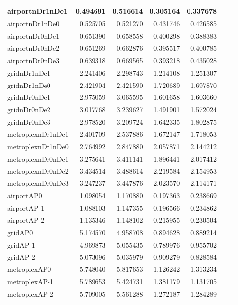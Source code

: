 \begin{longtable}{|l|r|r|r|r|r|r|}
\endlastfoot
airportnDr1nDe1 & 0.494691 & 0.516614 & 0.305164 & 0.337678 \\ \hline
airportnDr1nDe0 & 0.525705 & 0.521270 & 0.431746 & 0.426585 \\ \hline
airportnDr0nDe1 & 0.651390 & 0.658558 & 0.400298 & 0.388383 \\ \hline
airportnDr0nDe2 & 0.651269 & 0.662876 & 0.395517 & 0.400785 \\ \hline
airportnDr0nDe3 & 0.639318 & 0.669565 & 0.393218 & 0.435028 \\ \hline
gridnDr1nDe1 & 2.241406 & 2.298743 & 1.214108 & 1.251307 \\ \hline
gridnDr1nDe0 & 2.421904 & 2.421590 & 1.720689 & 1.697870 \\ \hline
gridnDr0nDe1 & 2.975059 & 3.065595 & 1.601658 & 1.603660 \\ \hline
gridnDr0nDe2 & 3.017768 & 3.239627 & 1.491901 & 1.572024 \\ \hline
gridnDr0nDe3 & 2.978520 & 3.209724 & 1.642335 & 1.802875 \\ \hline
metroplexnDr1nDe1 & 2.401709 & 2.537886 & 1.672147 & 1.718053 \\ \hline
metroplexnDr1nDe0 & 2.764992 & 2.847880 & 2.057871 & 2.144212 \\ \hline
metroplexnDr0nDe1 & 3.275641 & 3.411141 & 1.896441 & 2.017412 \\ \hline
metroplexnDr0nDe2 & 3.434514 & 3.488614 & 2.219584 & 2.154953 \\ \hline
metroplexnDr0nDe3 & 3.247237 & 3.447876 & 2.023570 & 2.114171 \\ \hline
airportAP0 & 1.098054 & 1.170880 & 0.197363 & 0.238669 \\ \hline
airportAP-1 & 1.088103 & 1.147355 & 0.196566 & 0.234862 \\ \hline
airportAP-2 & 1.135346 & 1.148102 & 0.215955 & 0.230504 \\ \hline
gridAP0 & 5.174570 & 4.958708 & 0.894628 & 0.889214 \\ \hline
gridAP-1 & 4.969873 & 5.055435 & 0.789976 & 0.955702 \\ \hline
gridAP-2 & 5.073096 & 5.035979 & 0.909279 & 0.828584 \\ \hline
metroplexAP0 & 5.748040 & 5.817653 & 1.126242 & 1.313234 \\ \hline
metroplexAP-1 & 5.789653 & 5.424731 & 1.381179 & 1.131705 \\ \hline
metroplexAP-2 & 5.709005 & 5.561288 & 1.272187 & 1.284289 \\ \hline

\end{longtable}
